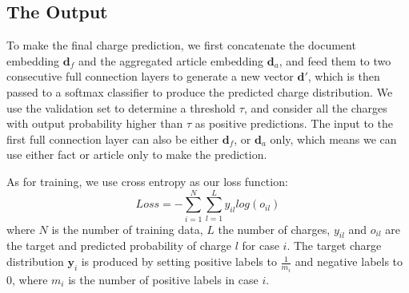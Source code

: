\subsection{The Output}
To make the final charge prediction, we first concatenate the document embedding $\mathbf{d}_f$ and the aggregated article embedding $\mathbf{d}_a$, and feed them to two consecutive full connection layers to generate a new vector $\mathbf{d}'$, which is then passed to a softmax classifier to produce the predicted charge distribution. We use the validation set to determine a threshold $\tau$, and consider all the charges with output probability higher than $\tau$ as positive predictions.
The input to the first full connection layer can also be either $\mathbf{d}_f$, or $\mathbf{d}_a$ only, which means we can use either fact or article only to make the prediction.

As for training, we use cross entropy as our loss function:
\begin{equation}
\label{original_loss}
Loss= -\sum_{i=1}^N\sum_{l=1}^L{y_{il} log(o_{il})}
\end{equation} 
where $N$ is the number of training data, $L$ the number of charges, $y_{il}$ and $o_{il}$ are the target and predicted probability of charge $l$ for case $i$. The target charge distribution $\mathbf{y}_i$ is produced by setting positive labels to $\frac{1}{m_i}$ and negative labels to $0$, where $m_i$ is the number of positive labels in case $i$.

